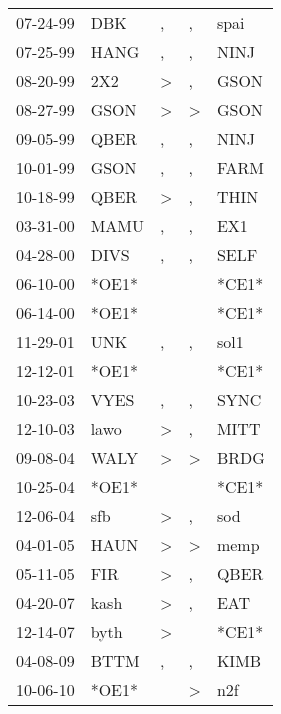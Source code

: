\begin{supertabular}{lllll}
 07-24-99 &    DBK &             , &             , &   spai \\
 07-25-99 &   HANG &             , &             , &   NINJ \\
 08-20-99 &    2X2 &  \textgreater &             , &   GSON \\
 08-27-99 &   GSON &  \textgreater &  \textgreater &   GSON \\
 09-05-99 &   QBER &             , &             , &   NINJ \\
 10-01-99 &   GSON &             , &             , &   FARM \\
 10-18-99 &   QBER &  \textgreater &             , &   THIN \\
 03-31-00 &   MAMU &             , &             , &    EX1 \\
 04-28-00 &   DIVS &             , &             , &   SELF \\
 06-10-00 &  *OE1* &               &               &  *CE1* \\
 06-14-00 &  *OE1* &               &               &  *CE1* \\
 11-29-01 &    UNK &             , &             , &   sol1 \\
 12-12-01 &  *OE1* &               &               &  *CE1* \\
 10-23-03 &   VYES &             , &             , &   SYNC \\
 12-10-03 &   lawo &  \textgreater &             , &   MITT \\
 09-08-04 &   WALY &  \textgreater &  \textgreater &   BRDG \\
 10-25-04 &  *OE1* &               &               &  *CE1* \\
 12-06-04 &    sfb &  \textgreater &             , &    sod \\
 04-01-05 &   HAUN &  \textgreater &  \textgreater &   memp \\
 05-11-05 &    FIR &  \textgreater &             , &   QBER \\
 04-20-07 &   kash &  \textgreater &             , &    EAT \\
 12-14-07 &   byth &  \textgreater &               &  *CE1* \\
 04-08-09 &   BTTM &             , &             , &   KIMB \\
 10-06-10 &  *OE1* &               &  \textgreater &    n2f \\
\end{supertabular}
